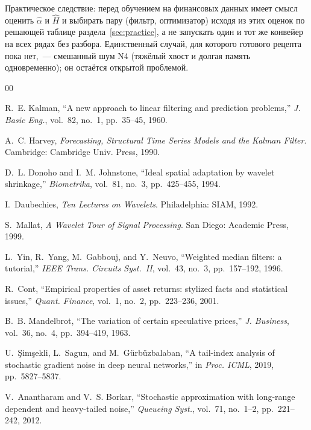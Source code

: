 \documentclass[conference]{IEEEtran}
\begin{document}
Практическое следствие: перед обучением на финансовых данных имеет
смысл оценить $\hat{\alpha}$ и $\hat{H}$ и выбирать пару (фильтр,
оптимизатор) исходя из этих оценок по решающей таблице
раздела~\ref{sec:practice}, а не запускать один и тот же конвейер на
всех рядах без разбора. Единственный случай, для которого готового
рецепта пока нет,~--- смешанный шум N4 (тяжёлый хвост и долгая память
одновременно); он остаётся открытой проблемой.

\begin{thebibliography}{00}

R.~E. Kalman, ``A new approach to linear filtering and prediction
problems,'' \textit{J. Basic Eng.}, vol.~82, no.~1, pp.~35--45, 1960.

A.~C. Harvey, \textit{Forecasting, Structural Time Series Models and
the Kalman Filter}. Cambridge: Cambridge Univ. Press, 1990.

D.~L. Donoho and I.~M. Johnstone, ``Ideal spatial adaptation by wavelet
shrinkage,'' \textit{Biometrika}, vol.~81, no.~3, pp.~425--455, 1994.

I.~Daubechies, \textit{Ten Lectures on Wavelets}. Philadelphia:
SIAM, 1992.

S.~Mallat, \textit{A Wavelet Tour of Signal Processing}. San Diego:
Academic Press, 1999.

L.~Yin, R.~Yang, M.~Gabbouj, and Y.~Neuvo, ``Weighted median filters:
a tutorial,'' \textit{IEEE Trans. Circuits Syst.~II}, vol.~43, no.~3,
pp.~157--192, 1996.

R.~Cont, ``Empirical properties of asset returns: stylized facts and
statistical issues,'' \textit{Quant. Finance}, vol.~1, no.~2,
pp.~223--236, 2001.

B.~B. Mandelbrot, ``The variation of certain speculative prices,''
\textit{J. Business}, vol.~36, no.~4, pp.~394--419, 1963.

U.~\c{S}im\c{s}ekli, L.~Sagun, and M.~G\"{u}rb\"{u}zbalaban,
``A tail-index analysis of stochastic gradient noise in deep neural
networks,'' in \textit{Proc. ICML}, 2019, pp.~5827--5837.

V.~Anantharam and V.~S. Borkar, ``Stochastic approximation with
long-range dependent and heavy-tailed noise,'' \textit{Queueing Syst.},
vol.~71, no.~1--2, pp.~221--242, 2012.


\end{thebibliography}
\end{document}
